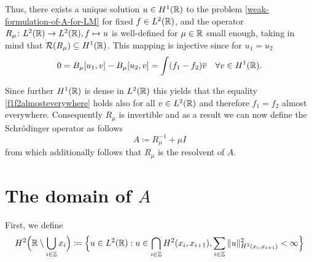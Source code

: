 Thus, there exists a unique solution $u \in H^{1}(\mathbb{R})$ to the problem \eqref{weak-formulation-of-A-for-LM} for fixed $f \in L^{2}(\mathbb{R})$, and the operator $R_{\mu} \colon L^{2}(\mathbb{R}) \rightarrow L^{2}(\mathbb{R}), f \mapsto u$ is well-defined for $\mu \in \mathbb{R}$ small enough, taking in mind that $\mathcal{R}(R_{\mu}) \subseteq H^{1}(\mathbb{R})$. This mapping is injective since for $u_{1} = u_{2}$
	\begin{equation}
		0 = B_{\mu}[u_{1}, v] - B_{\mu}[u_{2}, v]= \int (f_{1} - f_{2}) \overline{v} \quad \forall v \in H^{1}(\mathbb{R}). \label{f1f2almosteverywhere}
	\end{equation} 
	
Since further $H^{1}(\mathbb{R})$ is dense in $L^{2}(\mathbb{R})$ this yields that the equality \eqref{f1f2almosteverywhere} holds also for all $v \in L^{2}(\mathbb{R})$ and therefore $f_{1} = f_{2}$ almost everywhere. Consequently $R_{\mu}$ is invertible and as a result we can now define the Schrödinger operator as follows 
		\[ A \coloneqq R_{\mu}^{-1} + \mu I \]
from which additionally follows that $R_{\mu}$ is the resolvent of $A$.

\section{The domain of $A$}
First, we define
	\[ H^{2}\Big(\mathbb{R} \setminus \bigcup_{i \in \mathbb{Z}} x_{i} \Big) \coloneqq \Big\{ u \in L^{2}(\mathbb{R}) : u \in \bigcap_{i \in \mathbb{Z}} H^{2}(x_{i}, x_{i+1}), \sum_{i \in \mathbb{Z}} \|u\|^{2}_{H^{2}(x_{i}, x_{i+1})} < \infty \Big\} \]

